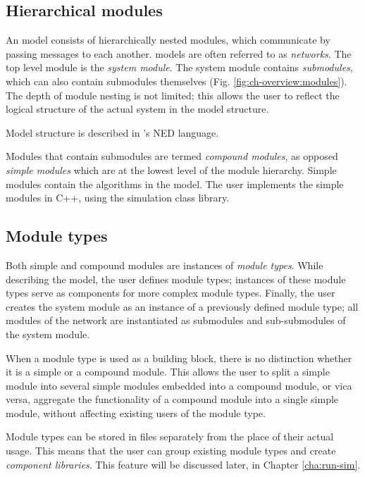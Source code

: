 \subsection{Hierarchical modules}


An {\opp} model consists of hierarchically nested
modules, which communicate by passing
messages to each another.
{\opp} models are often referred to as \textit{networks}. The top
level module is the \textit{system module}.  The system module
contains \textit{submodules}, which can also contain submodules
themselves (Fig. \ref{fig:ch-overview:modules}). The depth of module
nesting is not limited; this allows the user to reflect the logical
structure of the actual system in the model structure.

Model structure is described in {\opp}'s NED language.

Modules that contain submodules are termed \textit{compound
  modules}, as opposed \textit{simple
  modules} which are at the lowest level of the
module hierarchy. Simple modules contain the algorithms in the model.
The user implements the simple modules in C++, using the {\opp}
simulation class library.


\subsection{Module types}

Both simple and compound modules are instances of \textit{module
  types}. While describing the model, the user defines module types;
instances of these module types serve as components for more complex
module types. Finally, the user creates the system module as an
instance of a previously defined module type; all modules of the
network are instantiated as submodules and sub-submodules of the
system module.

When a module type is used as a building block, there is no
distinction whether it is a simple or a compound module. This allows
the user to split a simple module into several
simple modules embedded into a compound module,
or vica versa, aggregate the functionality of a compound module into a
single simple module, without affecting existing users of the module
type.

Module types can be stored in files separately from the place
of their actual usage. This means that the user can group existing
module types and create \textit{component libraries}. This feature
will be discussed later, in Chapter \ref{cha:run-sim}.



